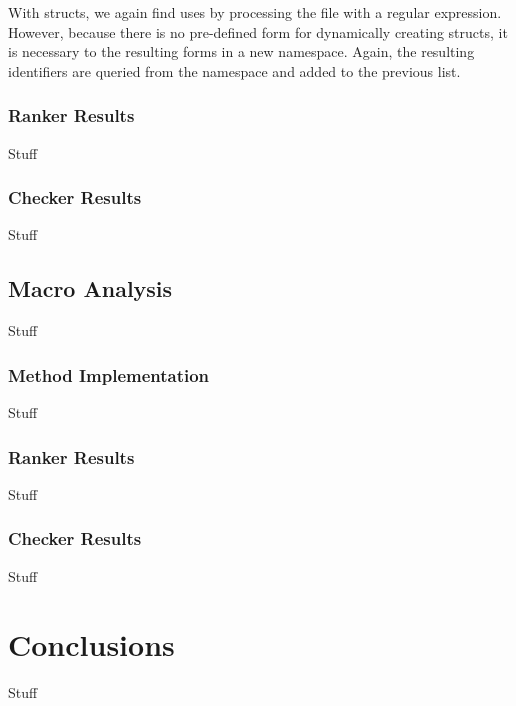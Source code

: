 \documentclass[ms,electronic,twosidetoc,letterpaper,chaptercenter,parttop,lol,lof,lot]{byumsphd}
\begin{document}
With structs, we again find uses by processing the file with a regular expression. However, because there is no pre-defined form for dynamically creating structs, it is necessary to  the resulting forms in a new namespace. Again, the resulting identifiers are queried from the namespace and added to the previous list.

\subsection{Ranker Results}

Stuff

\subsection{Checker Results}

Stuff

\section{Macro Analysis}

Stuff

\subsection{Method Implementation}

Stuff

\subsection{Ranker Results}

Stuff

\subsection{Checker Results}

Stuff

\chapter{Conclusions}

Stuff

\nocite{testentry}



\end{document}
